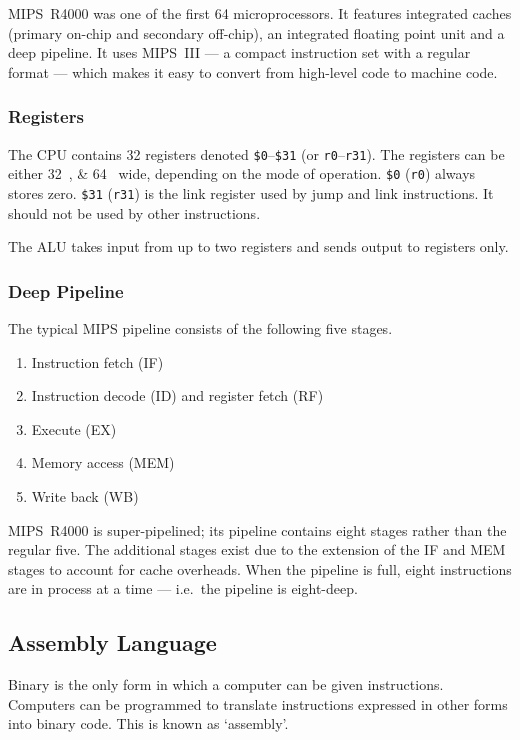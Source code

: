 MIPS~R4000 was one of the first \SI{64}{\bit} microprocessors.
It features integrated caches (primary on-chip and secondary off-chip), an integrated floating point unit and a deep pipeline.
It uses MIPS~III --- a compact instruction set with a regular format --- which makes it easy to convert from high-level code to machine code.

\subsubsection{Registers}

The CPU contains 32 registers denoted \texttt{\$0}--\texttt{\$31} (or \texttt{r0}--\texttt{r31}).
The registers can be either \SIlist[list-pair-separator={ or }]{32;64}{\bit} wide, depending on the mode of operation.
\texttt{\$0} (\texttt{r0}) always stores zero.
\texttt{\$31} (\texttt{r31}) is the link register used by jump and link instructions.
It should not be used by other instructions.

The ALU takes input from up to two registers and sends output to registers only.

\subsubsection{Deep Pipeline}

The typical MIPS pipeline consists of the following five stages.
\begin{enumerate}
  \item Instruction fetch (IF)
  \item Instruction decode (ID) and register fetch (RF)
  \item Execute (EX)
  \item Memory access (MEM)
  \item Write back (WB)
\end{enumerate}

MIPS~R4000 is super-pipelined; its pipeline contains eight stages rather than the regular five.
The additional stages exist due to the extension of the IF and MEM stages to account for cache overheads.
When the pipeline is full, eight instructions are in process at a time --- i.e.\ the pipeline is eight-deep.

\subsection{Assembly Language}

Binary is the only form in which a computer can be given instructions.
Computers can be programmed to translate instructions expressed in other forms into binary code.
This is known as `assembly'.

